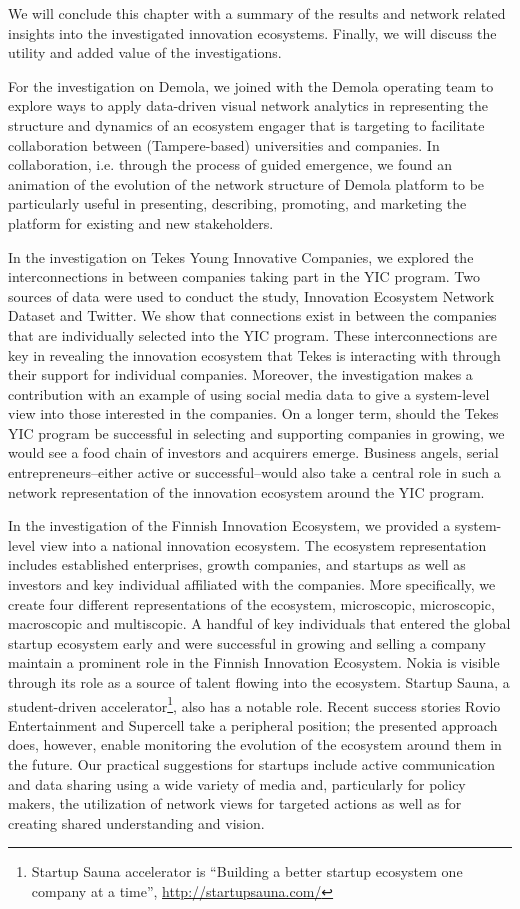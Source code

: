 We will conclude this chapter with a summary of the results and network related insights into the investigated innovation ecosystems. Finally, we will discuss the utility and added value of the investigations.

For the investigation on Demola, we joined with the Demola operating team to explore ways to apply data-driven visual network analytics in representing the structure and dynamics of an ecosystem engager that is targeting to facilitate collaboration between (Tampere-based) universities and companies. In collaboration, i.e. through the process of guided emergence, we found an animation of the evolution of the network structure of Demola platform to be particularly useful in presenting, describing, promoting, and marketing the platform for existing and new stakeholders.

In the investigation on Tekes Young Innovative Companies, we explored the interconnections in between companies taking part in the YIC program. Two sources of data were used to conduct the study, Innovation Ecosystem Network Dataset and Twitter. We show that connections exist in between the companies that are individually selected into the YIC program. These interconnections are key in revealing the innovation ecosystem that Tekes is interacting with through their support for individual companies. Moreover, the investigation makes a contribution with an example of using social media data to give a system-level view into those interested in the companies. On a longer term, should the Tekes YIC program be successful in selecting and supporting companies in growing, we would see a food chain of investors and acquirers emerge. Business angels, serial entrepreneurs--either active or successful--would also take a central role in such a network representation of the innovation ecosystem around the YIC program. 

In the investigation of the Finnish Innovation Ecosystem, we provided a system-level view into a national innovation ecosystem. The ecosystem representation includes established enterprises, growth companies, and startups as well as investors and key individual affiliated with the companies. More specifically, we create four different representations of the ecosystem, microscopic, microscopic, macroscopic and multiscopic. A handful of key individuals that entered the global startup ecosystem early and were successful in growing and selling a company maintain a prominent role in the Finnish Innovation Ecosystem. Nokia is visible through its role as a source of talent flowing into the ecosystem. Startup Sauna, a student-driven accelerator\footnote{Startup Sauna accelerator is ``Building a better startup ecosystem one company at a time'', \url{http://startupsauna.com/}},  also has a notable role. Recent success stories Rovio Entertainment and Supercell take a peripheral position; the presented approach does, however, enable monitoring the evolution of the ecosystem around them in the future. Our practical suggestions for startups include active communication and data sharing using a wide variety of media and, particularly for policy makers, the utilization of network views for targeted actions as well as for creating shared understanding and vision.

